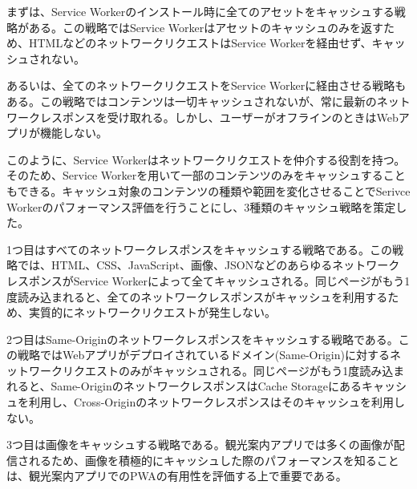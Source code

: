 まずは、Service Workerのインストール時に全てのアセットをキャッシュする戦略がある。この戦略ではService Workerはアセットのキャッシュのみを返すため、HTMLなどのネットワークリクエストはService Workerを経由せず、キャッシュされない。

あるいは、全てのネットワークリクエストをService Workerに経由させる戦略もある。この戦略ではコンテンツは一切キャッシュされないが、常に最新のネットワークレスポンスを受け取れる。しかし、ユーザーがオフラインのときはWebアプリが機能しない。

このように、Service Workerはネットワークリクエストを仲介する役割を持つ。そのため、Service Workerを用いて一部のコンテンツのみをキャッシュすることもできる。キャッシュ対象のコンテンツの種類や範囲を変化させることでSerivce Workerのパフォーマンス評価を行うことにし、3種類のキャッシュ戦略を策定した。

1つ目はすべてのネットワークレスポンスをキャッシュする戦略である。この戦略では、HTML、CSS、JavaScript、画像、JSONなどのあらゆるネットワークレスポンスがService Workerによって全てキャッシュされる。同じページがもう1度読み込まれると、全てのネットワークレスポンスがキャッシュを利用するため、実質的にネットワークリクエストが発生しない。

2つ目はSame-Originのネットワークレスポンスをキャッシュする戦略である。この戦略ではWebアプリがデプロイされているドメイン(Same-Origin)に対するネットワークリクエストのみがキャッシュされる。同じページがもう1度読み込まれると、Same-OriginのネットワークレスポンスはCache Storageにあるキャッシュを利用し、Cross-Originのネットワークレスポンスはそのキャッシュを利用しない。

3つ目は画像をキャッシュする戦略である。観光案内アプリでは多くの画像が配信されるため、画像を積極的にキャッシュした際のパフォーマンスを知ることは、観光案内アプリでのPWAの有用性を評価する上で重要である。